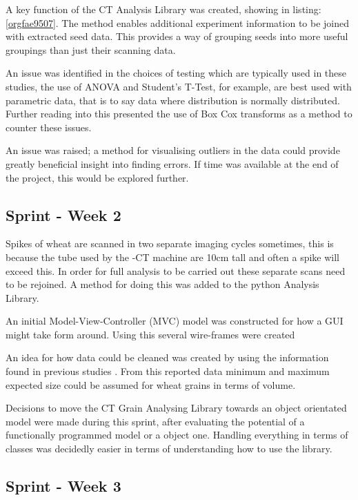 \documentclass[11pt]{report}
\begin{document}
A key function of the CT Analysis Library was created, showing in listing:\ref{orgfae9507}. The method enables additional experiment information to be joined with extracted seed data. This provides a way of grouping seeds into more useful groupings than just their scanning data.

An issue was identified in the choices of testing which are typically used in these studies, the use of ANOVA and Student's T-Test, for example, are best used with parametric data, that is to say data where distribution is normally distributed. Further reading into this presented the use of Box Cox transforms as a method to counter these issues.

An issue was raised; a method for visualising outliers in the data could provide greatly beneficial insight into finding errors. If time was available at the end of the project, this would be explored further.

\subsection{Sprint - Week 2}
\label{sec:orgf63c6ed}

Spikes of wheat are scanned in two separate imaging cycles sometimes, this is because the tube used by the \textmu{}-CT machine are 10cm tall and often a spike will exceed this. In order for full analysis to be carried out these separate scans need to be rejoined. A method for doing this was added to the python Analysis Library.

An initial Model-View-Controller (MVC) model was constructed for how a GUI might take form around. Using this several wire-frames were created

An idea for how data could be cleaned was created by using the information found in previous studies \cite{Hughes2017}. From this reported data minimum and maximum expected size could be assumed for wheat grains in terms of volume.

Decisions to move the CT Grain Analysing Library towards an object orientated model were made during this sprint, after evaluating the potential of a functionally programmed model or a object one. Handling everything in terms of classes was decidedly easier in terms of understanding how to use the library.

\subsection{Sprint - Week 3}
\label{sec:orga093db5}
\end{document}
